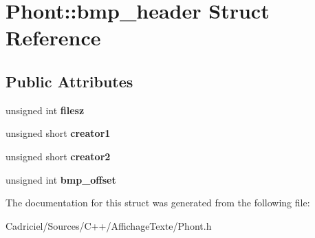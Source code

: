\hypertarget{struct_phont_1_1bmp__header}{\section{Phont\-:\-:bmp\-\_\-header Struct Reference}
\label{struct_phont_1_1bmp__header}
}
\subsection*{Public Attributes}
\begin{DoxyCompactItemize}
\item 
\hypertarget{struct_phont_1_1bmp__header_aa92f0c6ac4092eff8f0f9a521f5097a8}{unsigned int {\bfseries filesz}}\label{struct_phont_1_1bmp__header_aa92f0c6ac4092eff8f0f9a521f5097a8}

\item 
\hypertarget{struct_phont_1_1bmp__header_aaccca45f66b1c056f43202d14918fa88}{unsigned short {\bfseries creator1}}\label{struct_phont_1_1bmp__header_aaccca45f66b1c056f43202d14918fa88}

\item 
\hypertarget{struct_phont_1_1bmp__header_a61e3659957313b33ad0dce26073ed3ed}{unsigned short {\bfseries creator2}}\label{struct_phont_1_1bmp__header_a61e3659957313b33ad0dce26073ed3ed}

\item 
\hypertarget{struct_phont_1_1bmp__header_acb4719fdc8e3c1f39e91af79ea3dda57}{unsigned int {\bfseries bmp\-\_\-offset}}\label{struct_phont_1_1bmp__header_acb4719fdc8e3c1f39e91af79ea3dda57}

\end{DoxyCompactItemize}


The documentation for this struct was generated from the following file\-:\begin{DoxyCompactItemize}
\item 
Cadriciel/\-Sources/\-C++/\-Affichage\-Texte/Phont.\-h\end{DoxyCompactItemize}

